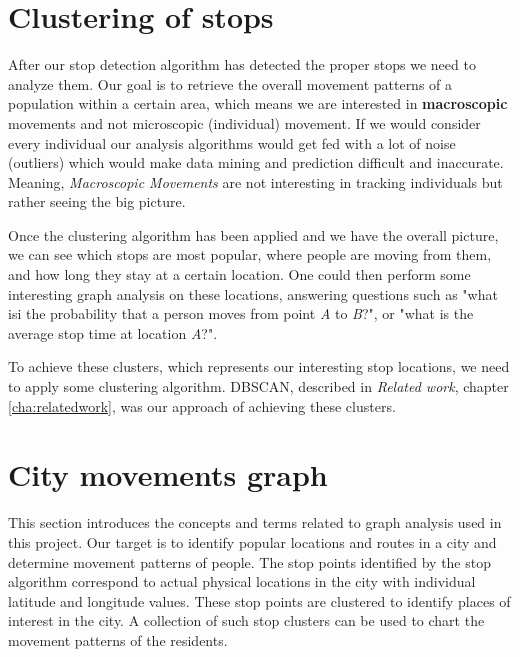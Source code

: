 \section{Clustering of stops}

After our stop detection algorithm has detected the proper stops we need to analyze them. Our goal is to retrieve the overall movement patterns of a population within a certain area, which means we are interested in \textbf{macroscopic} movements and not microscopic (individual) movement. If we would consider every individual our analysis algorithms would get fed with a lot of noise (outliers) which would make data mining and prediction difficult and inaccurate. Meaning, \textit{Macroscopic Movements} are not interesting in tracking individuals but rather seeing the big picture.

 Once the clustering algorithm has been applied and we have the overall picture, we can see which stops are most popular, where people are moving from them, and how long they stay at a certain location. One could then perform some interesting graph analysis on these locations, answering questions such as "what isi the probability that a person moves from point \textit{A} to \textit{B}?", or "what is the average stop time at location \textit{A}?". 
 
 To achieve these clusters, which represents our interesting stop locations, we need to apply some clustering algorithm. DBSCAN, described in\textit{ Related work}, chapter \ref{cha:relatedwork}, was our approach of achieving these clusters.  

\FloatBarrier
\section{City movements graph}
\label{cha:movementsGraph}
This section introduces the concepts and terms related to graph analysis used in this project. Our target is to identify popular locations and routes in a city and determine movement patterns of people. The stop points identified by the stop algorithm correspond to actual physical locations in the city with individual latitude and longitude values. These stop points are clustered to identify places of interest in the city. A collection of such stop clusters can be used to chart the movement patterns of the residents.

